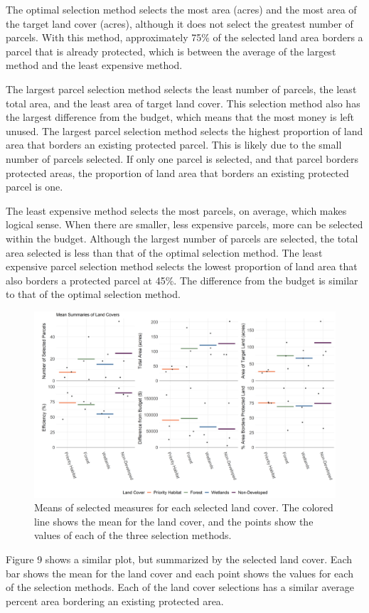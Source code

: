 \documentclass[12pt, stu, floatsintext,table]{apa7}
\begin{document}
The optimal selection method selects the  most area (acres) and the most area of the target land cover (acres), although it does not select the greatest number of parcels. With this method, approximately 75\% of the selected land area borders a parcel that is already protected, which is between the average of the largest method and the least expensive method. 

The largest parcel selection method selects the least number of parcels, the least total area, and the least area of target land cover. This selection method also has the largest difference from the budget, which means that the most money is left unused. The largest parcel selection method selects the highest proportion of land area that borders an existing protected parcel. This is likely due to the small number of parcels selected. If only one parcel is selected, and that parcel borders protected areas, the proportion of land area that borders an existing protected parcel is one.

The least expensive method selects the most parcels, on average, which makes logical sense. When there are smaller, less expensive parcels, more can be selected within the budget. Although the largest number of parcels are selected, the total area selected is less than that of the optimal selection method. The least expensive parcel selection method selects the lowest proportion of land area that also borders a protected parcel at 45\%. The difference from the budget is similar to that of the optimal selection method. 

\begin{figure}[hbtp]
    \centering
    \includegraphics[width = \textwidth]{figures/summary_lc.png}
    \caption{Means of selected measures for each selected land cover. The colored line shows the mean for the land cover, and the points show the values of each of the three selection methods.}
\end{figure}
Figure 9 shows a similar plot, but summarized by the selected land cover. Each bar shows the mean for the land cover and each point shows the values for each of the selection methods. Each of the land cover selections has a similar average percent area bordering an existing protected area.  
\end{document}
